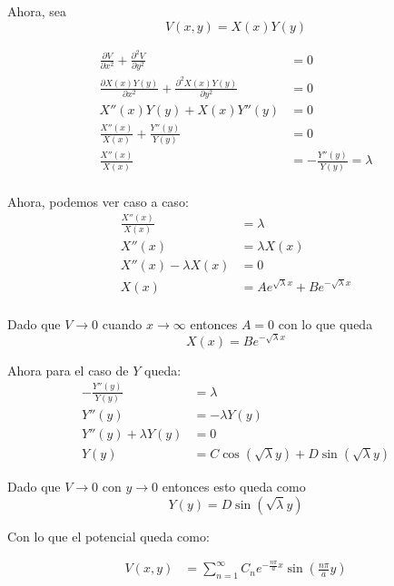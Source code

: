 \documentclass{report}
\begin{document}
Ahora, sea \[
	V \left( x, y \right) = X(x)Y(y)
\]

\begin{align*}
	\frac{\partial V}{\partial x^2} + \frac{\partial^2 V}{\partial y^2} &= 0\\
	\frac{\partial X(x)Y(y)}{\partial x^2} + \frac{\partial^2 X(x)Y(y)}{\partial y^2} &= 0\\
	X''(x)Y(y) + X(x)Y''(y) &= 0\\
	\frac{X''(x)}{X(x)} + \frac{Y''(y)}{Y(y)} &= 0\\
	\frac{X''(x)}{X(x)} &= - \frac{Y''(y)}{Y(y)} = \lambda \\
\end{align*}

Ahora, podemos ver caso a caso:
\begin{align*}
	\frac{X''(x)}{X(x)} &= \lambda\\
	X''(x) &= \lambda X(x)\\
	X''(x) - \lambda X(x) &= 0\\
	X(x) &= A e^{\sqrt{\lambda}x} + B e^{-\sqrt{\lambda}x}\\
\end{align*}

Dado que $V\to 0$ cuando $x\to \infty$ entonces $A = 0$ con lo que queda \[
	X(x) = Be^{-\sqrt{\lambda}x}
\]

Ahora para el caso de $Y$ queda:
\begin{align*}
	-\frac{Y''(y)}{Y(y)} &= \lambda\\
	Y''(y) &= -\lambda Y(y)\\
	Y''(y) + \lambda Y(y) &= 0\\
	Y(y) &= C\cos(\sqrt{\lambda}y) + D\sin(\sqrt{\lambda}y)
\end{align*}

Dado que $V\to 0$ con $y \to 0$ entonces esto queda como \[
	Y(y) = D\sin(\sqrt{\lambda}y)
\]

Con lo que el potencial queda como:

\begin{align*}
	V(x, y) &= \sum_{n = 1}^{\infty} C_n e^{-\frac{n\pi}{a}x}\sin \left( \frac{n\pi}{a} y \right)
\end{align*}
\end{document}
